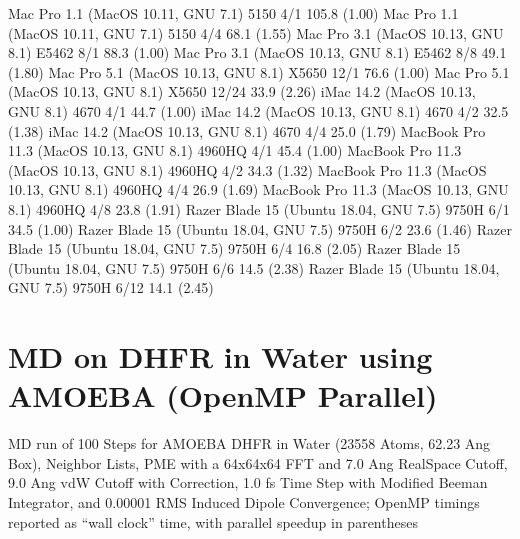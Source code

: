 \documentclass[letterpaper,11pt,english]{sphinxmanual}
\begin{document}
\begin{sphinxVerbatim}[commandchars=\\\{\}]
Mac Pro 1.1 (MacOS 10.11, GNU 7.1)             5150           4/1       105.8 (1.00)
Mac Pro 1.1 (MacOS 10.11, GNU 7.1)             5150           4/4        68.1 (1.55)
Mac Pro 3.1 (MacOS 10.13, GNU 8.1)            E5462           8/1        88.3 (1.00)
Mac Pro 3.1 (MacOS 10.13, GNU 8.1)            E5462           8/8        49.1 (1.80)
Mac Pro 5.1 (MacOS 10.13, GNU 8.1)            X5650          12/1        76.6 (1.00)
Mac Pro 5.1 (MacOS 10.13, GNU 8.1)            X5650         12/24        33.9 (2.26)
iMac 14.2 (MacOS 10.13, GNU 8.1)               4670           4/1        44.7 (1.00)
iMac 14.2 (MacOS 10.13, GNU 8.1)               4670           4/2        32.5 (1.38)
iMac 14.2 (MacOS 10.13, GNU 8.1)               4670           4/4        25.0 (1.79)
MacBook Pro 11.3 (MacOS 10.13, GNU 8.1)      4960HQ           4/1        45.4 (1.00)
MacBook Pro 11.3 (MacOS 10.13, GNU 8.1)      4960HQ           4/2        34.3 (1.32)
MacBook Pro 11.3 (MacOS 10.13, GNU 8.1)      4960HQ           4/4        26.9 (1.69)
MacBook Pro 11.3 (MacOS 10.13, GNU 8.1)      4960HQ           4/8        23.8 (1.91)
Razer Blade 15 (Ubuntu 18.04, GNU 7.5)        9750H           6/1        34.5 (1.00)
Razer Blade 15 (Ubuntu 18.04, GNU 7.5)        9750H           6/2        23.6 (1.46)
Razer Blade 15 (Ubuntu 18.04, GNU 7.5)        9750H           6/4        16.8 (2.05)
Razer Blade 15 (Ubuntu 18.04, GNU 7.5)        9750H           6/6        14.5 (2.38)
Razer Blade 15 (Ubuntu 18.04, GNU 7.5)        9750H          6/12        14.1 (2.45)
\end{sphinxVerbatim}


\section{MD on DHFR in Water using AMOEBA (OpenMP Parallel)}
\label{\detokenize{text/benchmarks:md-on-dhfr-in-water-using-amoeba-openmp-parallel}}
MD run of 100 Steps for AMOEBA DHFR in Water (23558 Atoms, 62.23 Ang Box), Neighbor Lists, PME with a 64x64x64 FFT and 7.0 Ang Real\sphinxhyphen{}Space Cutoff, 9.0 Ang vdW Cutoff with Correction, 1.0 fs Time Step with Modified Beeman Integrator, and 0.00001 RMS Induced Dipole Convergence; OpenMP timings reported as “wall clock” time, with parallel speedup in parentheses

\end{document}
